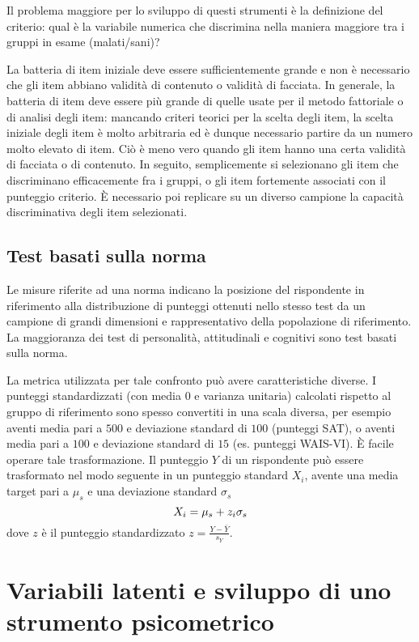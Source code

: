 Il problema maggiore per lo sviluppo di questi strumenti è la definizione del criterio: qual è la variabile numerica che discrimina nella maniera maggiore tra i gruppi in esame (malati/sani)? 

La batteria di item iniziale deve essere sufficientemente grande e non è necessario che gli item abbiano validità di contenuto o validità di facciata. In generale, la batteria di item deve essere più grande di quelle usate per il metodo fattoriale o di analisi degli item: mancando criteri teorici per la scelta degli item, la scelta iniziale degli item è molto arbitraria ed è dunque necessario partire da un numero molto elevato di item. Ciò è meno vero quando gli item hanno una certa validità di facciata o di contenuto. In seguito, semplicemente si selezionano gli item che discriminano efficacemente fra i gruppi, o gli item fortemente associati con il punteggio criterio. È necessario poi replicare su un diverso campione la capacità discriminativa degli item selezionati.

\subsection{Test basati sulla norma}  

Le misure riferite ad una norma indicano la posizione del  rispondente in riferimento alla distribuzione di punteggi ottenuti nello stesso test da un campione di grandi dimensioni e rappresentativo della popolazione
di riferimento. La maggioranza dei test di personalità, attitudinali e cognitivi sono test basati sulla norma.

La metrica utilizzata per tale confronto può avere caratteristiche diverse. I punteggi standardizzati (con media $0$ e varianza unitaria) calcolati rispetto al gruppo di riferimento sono spesso convertiti  in una scala diversa, per esempio aventi media pari a $500$ e deviazione standard di $100$ (punteggi SAT), o aventi media pari
  a $100$ e deviazione standard di $15$ (es. punteggi WAIS-VI). È facile operare tale trasformazione. Il punteggio $Y$ di un rispondente può essere trasformato nel modo seguente in un  punteggio standard $X_i$, avente una media target pari a $\mu_s$ e una deviazione standard $\sigma_s$
\begin{equation}
X_i = \mu_s + z_i \sigma_s\notag
\end{equation}
dove $z$ è il punteggio standardizzato $z=\frac{Y-\bar{Y}}{s_Y}$.  


\section{Variabili latenti e sviluppo di uno strumento psicometrico}

